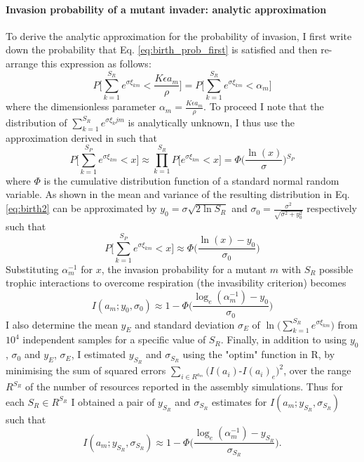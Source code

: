 \documentclass[a4paper]{report}
\DeclareMathOperator{\log}{log}
\begin{document}
{\paragraph{Invasion probability of a mutant invader: analytic approximation} To derive the analytic approximation for the probability of invasion, I first write down the probability that Eq. \eqref{eq:birth_prob_first} is satisfied and then re-arrange this expression as follows:
\begin{equation}
P\Bigg[\sum_{k=1}^{S_{R}}e^{\sigma\xi_{km}}<\frac{K\epsilon a_{m}}{\rho}\Bigg]=P\Bigg[\sum_{k=1}^{S_{R}}e^{\sigma\xi_{km}}<\alpha_{m}\Bigg]
 \label{eq:birth}
\end{equation}
where the dimensionless parameter $\alpha_m=\frac{K \epsilon a_{m}}{\rho}$. To proceed I note that the distribution of $\sum_{k=1}^{S_{R}}e^{\sigma\xi_kjm}$ is analytically unknown, I thus use the approximation derived in \citep{Rossberg2011a} such that
\begin{equation}
P\Bigg[\sum_{k=1}^{S_{P}}e^{\sigma\xi_{km}}<x\Bigg]\approx\prod_{k=1}^{S_{R}}P\Bigg[e^{\sigma\xi_{km}}<x\Bigg]=\Phi\Big(\frac{\ln(x)}{\sigma}\Big){}^{S_{P}} \label{eq:birth2}
\end{equation}
where $\Phi$ is the cumulative distribution function of a standard normal random variable. As shown in \citep{Rossberg2011a} the mean and variance of the resulting distribution in Eq. \eqref{eq:birth2} can be approximated by $y_{0}=\sigma\sqrt{2\ln S_{R}}$ and $\sigma_{0}=\frac{\sigma^{2}}{\sqrt{\sigma^{2}+y_{0}^{2}}}$ respectively such that
\begin{equation}
P\Bigg[\sum_{k=1}^{S_{P}}e^{\sigma\xi_{km}}<x\Bigg]\approx\Phi\Big(\frac{\ln(x)-y_{0}}{\sigma_{0}}\Big) \label{eq:birth44}
\end{equation}
Substituting $\alpha_{m}^{-1}$ for $x$, the invasion probability
for a mutant $m$ with $S_{R}$ possible trophic interactions to overcome
respiration (the invasibility criterion) becomes
\begin{equation}
I(a_{m};y_{0},\sigma_{0})\approx1-\Phi\Bigg(\frac{\log_{e}(\alpha_{m}^{-1})-y_{0}}{\sigma_{0}}\Bigg) \label{eq:birth3}
\end{equation}
I also determine the mean $y_{E}$ and standard deviation $\sigma_{E}$ of $\ln\big(\sum_{k=1}^{S_{R}}e^{\sigma\xi_{km}}\big)$ from $10^4$ independent samples for a specific value of $S_{R}$. Finally, in addition to using $y_0$, $\sigma_0$ and $y_{E}$, $\sigma_{E}$,  I estimated $y_{S_{R}}$ and $\sigma_{S_{R}}$ using
the "optim" function in R, by minimising the sum of squared errors $\sum_{i\in R^{a_{m}}}(I(a_{i})$-$I(a_{i})_{e})^{2}$,
over the range $R^{S_{R}}$ of the number of resources reported in the assembly simulations. Thus for each $S_{R}\in R^{S_{R}}$
I obtained a pair of $y_{S_{R}}$ and $\sigma_{S_{R}}$ estimates
for $I(a_{m}; y_{S_{R}},\sigma_{S_{R}})$ such that 
\begin{equation}
I(a_{m};y_{S_{R}},\sigma_{S_{R}})\approx1-\Phi\Bigg(\frac{\log_{e}(\alpha_{m}^{-1})-y_{S_{R}}}{\sigma_{S_{R}}}\Bigg).\label{eq:birth3-2}
\end{equation}

}
\end{document}
